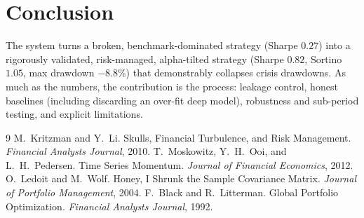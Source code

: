 \documentclass[11pt]{article}
\begin{document}
\section{Conclusion}
The system turns a broken, benchmark-dominated strategy (Sharpe $0.27$) into a rigorously validated,
risk-managed, alpha-tilted strategy (Sharpe $0.82$, Sortino $1.05$, max drawdown $-8.8\%$) that
demonstrably collapses crisis drawdowns. As much as the numbers, the contribution is the process:
leakage control, honest baselines (including discarding an over-fit deep model), robustness and
sub-period testing, and explicit limitations.

\begin{thebibliography}{9}
 M.~Kritzman and Y.~Li. Skulls, Financial Turbulence, and Risk Management.
\emph{Financial Analysts Journal}, 2010.
 T.~Moskowitz, Y.~H.~Ooi, and L.~H.~Pedersen. Time Series Momentum.
\emph{Journal of Financial Economics}, 2012.
 O.~Ledoit and M.~Wolf. Honey, I Shrunk the Sample Covariance Matrix.
\emph{Journal of Portfolio Management}, 2004.
 F.~Black and R.~Litterman. Global Portfolio Optimization.
\emph{Financial Analysts Journal}, 1992.
\end{thebibliography}
\end{document}
